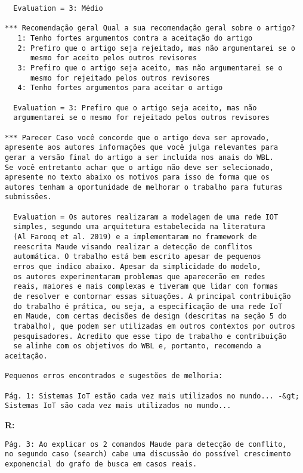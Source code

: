 \begin{verbatim}
  Evaluation = 3: Médio

*** Recomendação geral Qual a sua recomendação geral sobre o artigo?
   1: Tenho fortes argumentos contra a aceitação do artigo
   2: Prefiro que o artigo seja rejeitado, mas não argumentarei se o 
      mesmo for aceito pelos outros revisores
   3: Prefiro que o artigo seja aceito, mas não argumentarei se o 
      mesmo for rejeitado pelos outros revisores
   4: Tenho fortes argumentos para aceitar o artigo

  Evaluation = 3: Prefiro que o artigo seja aceito, mas não 
  argumentarei se o mesmo for rejeitado pelos outros revisores

*** Parecer Caso você concorde que o artigo deva ser aprovado, 
apresente aos autores informações que você julga relevantes para 
gerar a versão final do artigo a ser incluída nos anais do WBL. 
Se você entretanto achar que o artigo não deve ser selecionado, 
apresente no texto abaixo os motivos para isso de forma que os 
autores tenham a oportunidade de melhorar o trabalho para futuras 
submissões.

  Evaluation = Os autores realizaram a modelagem de uma rede IOT 
  simples, segundo uma arquitetura estabelecida na literatura 
  (Al Farooq et al. 2019) e a implementaram no framework de 
  reescrita Maude visando realizar a detecção de conflitos 
  automática. O trabalho está bem escrito apesar de pequenos 
  erros que indico abaixo. Apesar da simplicidade do modelo, 
  os autores experimentaram problemas que aparecerão em redes 
  reais, maiores e mais complexas e tiveram que lidar com formas 
  de resolver e contornar essas situações. A principal contribuição 
  do trabalho é prática, ou seja, a especificação de uma rede IoT 
  em Maude, com certas decisões de design (descritas na seção 5 do 
  trabalho), que podem ser utilizadas em outros contextos por outros 
  pesquisadores. Acredito que esse tipo de trabalho e contribuição 
  se alinhe com os objetivos do WBL e, portanto, recomendo a aceitação.

Pequenos erros encontrados e sugestões de melhoria:

Pág. 1: Sistemas IoT estão cada vez mais utilizados no mundo... -&gt; 
Sistemas IoT são cada vez mais utilizados no mundo...
\end{verbatim}

{\bf R:} 

\begin{verbatim}
Pág. 3: Ao explicar os 2 comandos Maude para detecção de conflito, 
no segundo caso (search) cabe uma discussão do possível crescimento 
exponencial do grafo de busca em casos reais.
\end{verbatim}

